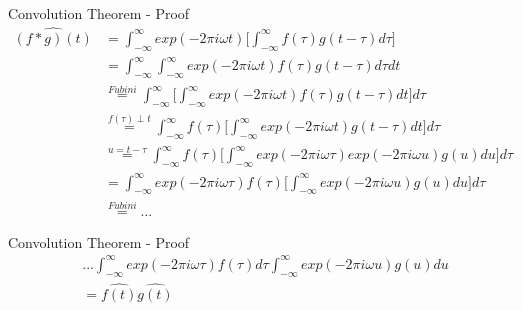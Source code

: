 \documentclass[11pt,compress,t,notes=noshow, xcolor=table]{beamer}
\begin{document}
 \begin{vbframe}{Convolution Theorem - Proof}
     \begin{equation*}
         \begin{split}
             \widehat{(f \ast g)(t)} &= \int_{-\infty}^\infty exp(-2 \pi i \omega t) \Big[ \int_{-\infty}^\infty f(\tau) g(t-\tau)d\tau \Big] \\
             & = \int_{-\infty}^\infty \int_{-\infty}^\infty exp(-2 \pi i \omega t) f(\tau)g(t-\tau)d\tau dt \\
             & \overset{Fubini}{=} \int_{-\infty}^\infty \Big[ \int_{-\infty}^\infty exp(-2 \pi i \omega t) f(\tau) g(t-\tau ) dt  \Big] d\tau \\
             & \overset{f(\tau) \perp t}{=} \int_{-\infty}^\infty f(\tau) \Big[ \int_{-\infty}^\infty exp(-2 \pi i \omega t) g(t-\tau) dt \Big]d \tau \\
             & \overset{u = t - \tau}{=} \int_{-\infty}^\infty f(\tau) \Big[ \int_{-\infty}^\infty exp(-2\pi i \omega \tau) exp(-2 \pi i \omega u) g(u) du \Big] d\tau \\
             & = \int_{-\infty}^\infty exp(-2 \pi i \omega \tau) f(\tau) \Big[ \int_{-\infty}^\infty exp(-2 \pi i \omega u) g(u) du \Big] d \tau \\
             & \overset{Fubini}{=} ...
         \end{split}
     \end{equation*}
 \end{vbframe}
 
 \begin{vbframe}{Convolution Theorem - Proof}
     \begin{equation*}
         \begin{split}
             &... \int_{-\infty}^\infty exp(-2 \pi i \omega \tau) f(\tau) d\tau \int_{-\infty}^\infty exp(-2 \pi i \omega u) g(u) du \\
             &= \hat{f(t)}\hat{g(t)}
         \end{split}
     \end{equation*}
 \end{vbframe}

\end{document}
